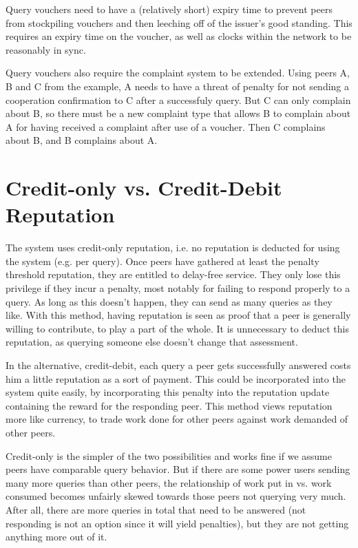 Query vouchers need to have a (relatively short) expiry time to prevent peers
from stockpiling vouchers and then leeching off of the issuer's good standing.
This requires an expiry time on the voucher, as well as clocks within the
network to be reasonably in sync.

Query vouchers also require the complaint system to be extended. Using peers A,
B and C from the example, A needs to have a threat of penalty for not sending a
cooperation confirmation to C after a successfuly query. But C can only complain
about B, so there must be a new complaint type that allows B to complain about A
for having received a complaint after use of a voucher. Then C complains about
B, and B complains about A.

\section{Credit-only vs. Credit-Debit Reputation}
\label{sec:desc_credit_only_vs_credit_debit}
The system uses credit-only reputation, i.e. no reputation is deducted for using
the system (e.g. per query). Once peers have gathered at least the penalty
threshold reputation, they are entitled to delay-free service. They only lose
this privilege if they incur a penalty, most notably for failing to respond
properly to a query. As long as this doesn't happen, they can send as many
queries as they like. With this method, having reputation is seen as proof that
a peer is generally willing to contribute, to play a part of the whole. It is
unnecessary to deduct this reputation, as querying someone else doesn't change
that assessment.

In the alternative, credit-debit, each query a peer gets successfully answered
costs him a little reputation as a sort of payment. This could be incorporated
into the system quite easily, by incorporating this penalty into the reputation
update containing the reward for the responding peer. This method views
reputation more like currency, to trade work done for other peers against work
demanded of other peers.

Credit-only is the simpler of the two possibilities and works fine if we assume
peers have comparable query behavior. But if there are some power users sending
many more queries than other peers, the relationship of work put in vs. work
consumed becomes unfairly skewed towards those peers not querying very much.
After all, there are more queries in total that need to be answered (not
responding is not an option since it will yield penalties), but they are not
getting anything more out of it.

